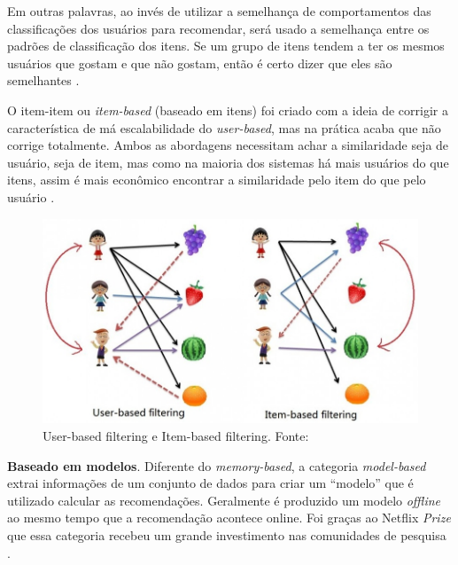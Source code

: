 Em outras palavras, ao invés de utilizar a semelhança de comportamentos das classificações dos usuários para recomendar, será usado a semelhança entre os padrões de classificação dos itens. Se um grupo de itens tendem a ter os mesmos usuários que gostam e que não gostam, então é certo dizer que eles são semelhantes \cite{Ekstrand:2011:CFR:2185827.2185828}.

O item-item ou \textit{item-based} (baseado em itens) foi criado com a ideia de corrigir a característica de má escalabilidade do \textit{user-based}, mas na prática acaba que não corrige totalmente. Ambos as abordagens necessitam achar a similaridade seja de usuário, seja de item, mas como na maioria dos sistemas há mais usuários do que itens, assim é mais econômico encontrar a similaridade pelo item do que pelo usuário \cite{Ekstrand:2011:CFR:2185827.2185828}.

\begin{figure}[H]
    \centering
    \includegraphics[scale=0.4]{figuras/referencial_teorico/user_based_item_based.jpg}
    \caption[User-based filtering e Item-based filtering]{User-based filtering e Item-based filtering. Fonte: \cite{Pinela:2017}}
    \label{fig:user_based_item_based}
\end{figure}


\textbf{Baseado em modelos}. Diferente do \textit{memory-based}, a categoria \textit{model-based} extrai informações de um conjunto de dados para criar um “modelo” que é utilizado calcular as recomendações. Geralmente é produzido um modelo \textit{offline} ao mesmo tempo que a recomendação acontece online. Foi graças ao Netflix \textit{Prize} que essa categoria recebeu um grande investimento nas comunidades de pesquisa \cite{Levinas2014AnAO}.

